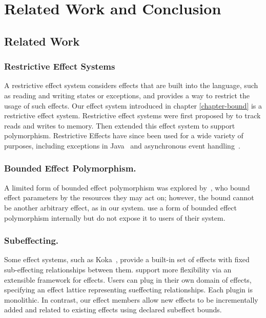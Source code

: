 
\chapter{Related Work and Conclusion}

\section{Related Work}

\subsection{Restrictive Effect Systems}
A restrictive effect system considers effects that are built into the language, such as reading and writing states or exceptions, and provides a way to restrict the usage of such effects. Our effect system introduced in chapter \ref{chapter-bound} is a restrictive effect system. Restrictive effect systems were first proposed by \citet{lucassen87} to track reads and writes to memory. Then \citet{lucassen88} extended this effect system to support polymorphism.  Restrictive Effects have since been used for a wide variety of purposes, including exceptions in Java~\cite{kiniry06} and asynchronous event handling~\cite{bracevac18}. 

\subsection{ Bounded Effect Polymorphism.}  A limited form of bounded effect polymorphism was explored by~\citet{10.5555/645393.651891}, who bound effect parameters by the resources they may act on; however, the bound cannot be another arbitrary effect, as in our system.  \citet{DBLP:conf/ecoop/LongLR15} use a form of bounded effect polymorphism internally but do not expose it to users of their system.

\subsection{Subeffecting.} 
Some effect systems, such as Koka~\cite{leijen14}, provide a built-in set of effects with fixed sub-effecting relationships between them.
\citet{rytz12} support more flexibility via an extensible framework for effects.  Users can plug in their own domain of effects, specifying an effect lattice representing sueffecting relationships.  Each plugin is monolithic.  In contrast, our effect members allow new effects to be incrementally added and related to existing effects using declared subeffect bounds.

